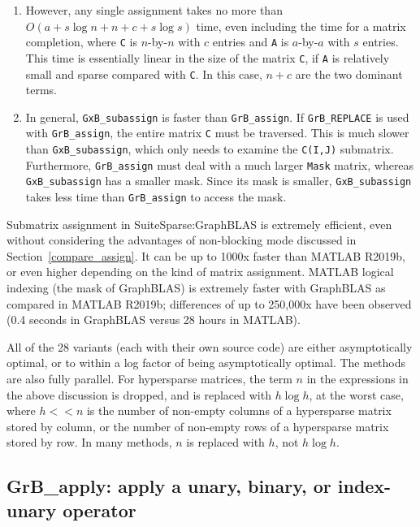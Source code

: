 \documentclass[12pt]{article}
\begin{document}
{\begin{enumerate}
\item However, any single assignment takes no more than $O (a + s \log n + n +
c + s \log s )$ time, even including the time for a matrix completion, where
\verb'C' is $n$-by-$n$ with $c$ entries and \verb'A' is $a$-by-$a$ with $s$
entries.  This time is essentially linear in the size of the matrix \verb'C',
if \verb'A' is relatively small and sparse compared with \verb'C'.  In this
case, $n+c$ are the two dominant terms.

\item In general, \verb'GxB_subassign' is faster than \verb'GrB_assign'.
If \verb'GrB_REPLACE' is used with \verb'GrB_assign', the entire matrix
\verb'C' must be traversed.  This is much slower than \verb'GxB_subassign',
which only needs to examine the \verb'C(I,J)' submatrix.  Furthermore,
\verb'GrB_assign' must deal with a much larger \verb'Mask' matrix, whereas
\verb'GxB_subassign' has a smaller mask.  Since its mask is smaller,
\verb'GxB_subassign' takes less time than \verb'GrB_assign' to access the mask.

\end{enumerate}


Submatrix assignment in SuiteSparse:GraphBLAS is extremely efficient, even
without considering the advantages of non-blocking mode discussed in
Section~\ref{compare_assign}.  It can be up to 1000x faster than MATLAB R2019b,
or even higher depending on the kind of matrix assignment.  MATLAB logical
indexing (the mask of GraphBLAS) is extremely faster with GraphBLAS as compared
in MATLAB R2019b; differences of up to 250,000x have been observed (0.4 seconds
in GraphBLAS versus 28 hours in MATLAB).

All of the 28 variants (each with their own source code) are either
asymptotically optimal, or to within a log factor of being asymptotically
optimal.  The methods are also fully parallel.  For hypersparse matrices, the
term $n$ in the expressions in the above discussion is dropped, and is replaced
with $h \log h$, at the worst case, where $h << n$ is the number of non-empty
columns of a hypersparse matrix stored by column, or the number of non-empty
rows of a hypersparse matrix stored by row.  In many methods, $n$ is replaced
with $h$, not $h \log h$.

\newpage
\subsection{{\sf GrB\_apply:} apply a unary, binary, or index-unary operator}
\label{apply}

}
\end{document}
